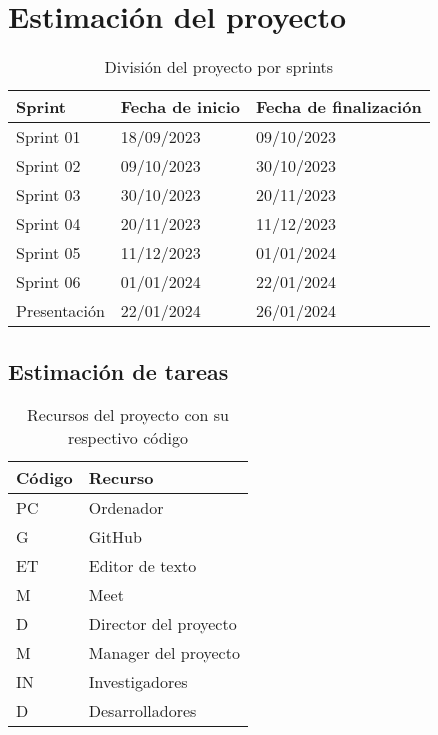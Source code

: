\chapter{Estimación del proyecto}
\label{cap:estimacion}

\begin{table}[H]
    \centering
    \begin{tabular}{|l|l|l|}
    \hline
    \rowcolor[HTML]{8EA9D8} 
    Sprint       & Fecha de inicio & Fecha de finalización \\ \hline
    Sprint 01    & 18/09/2023      & 09/10/2023            \\ \hline
    Sprint 02    & 09/10/2023      & 30/10/2023            \\ \hline
    Sprint 03    & 30/10/2023      & 20/11/2023            \\ \hline
    Sprint 04    & 20/11/2023      & 11/12/2023            \\ \hline
    Sprint 05    & 11/12/2023      & 01/01/2024            \\ \hline
    Sprint 06    & 01/01/2024      & 22/01/2024            \\ \hline
    Presentación & 22/01/2024      & 26/01/2024            \\ \hline
    \end{tabular}
    \caption{División del proyecto por sprints}
    \label{tab:proyecto_estimacion}
\end{table}

\section{Estimación de tareas}
\label{sec:estimacion_tareas}

\begin{table}[H]
    \centering
    \begin{tabular}{|l|l|}
    \hline
    \rowcolor[HTML]{8EA9D8} 
    Código & Recurso               \\ \hline
    PC     & Ordenador             \\ \hline
    G      & GitHub                \\ \hline
    ET     & Editor de texto       \\ \hline
    M      & Meet                  \\ \hline
    D      & Director del proyecto \\ \hline
    M      & Manager del proyecto  \\ \hline
    IN     & Investigadores        \\ \hline
    D      & Desarrolladores       \\ \hline
    \end{tabular}
    \caption{Recursos del proyecto con su respectivo código}
    \label{tab:recursos}
\end{table}

